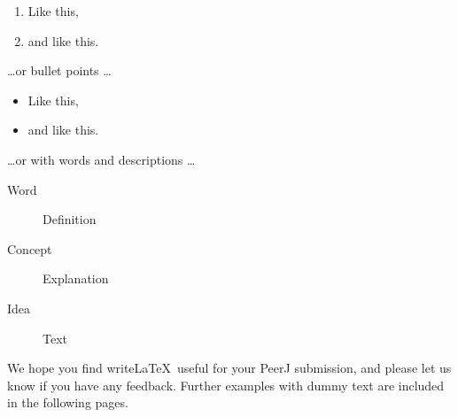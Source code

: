 \documentclass[fleqn,10pt]{wlpeerj}
\begin{document}
\begin{enumerate}[noitemsep] 
	\item Like this,
	\item and like this.
\end{enumerate}
\dots or bullet points \dots
\begin{itemize}[noitemsep] 
	\item Like this,
	\item and like this.
\end{itemize}
\dots or with words and descriptions \dots
\begin{description}
	\item[Word] Definition
	\item[Concept] Explanation
	\item[Idea] Text
\end{description}

We hope you find write\LaTeX\ useful for your PeerJ submission, and please let us know if you have any feedback. Further examples with dummy text are included in the following pages.



\end{document}
